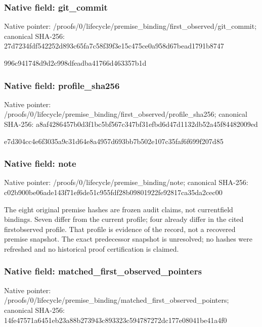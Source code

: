 \documentclass[10pt,a4paper]{article}
\begin{document}
\subsubsection{Native field: git\_commit}


Native pointer: /proofs/0/lifecycle/prem\allowbreak{}ise\_binding/first\_observ\allowbreak{}ed/git\_commit; canonical SHA-256: 27d7234fdf542252d893c65f\allowbreak{}a7c58f39f3e15c475ce0a958\allowbreak{}d67bead1791b8747


996c941748d9d2c998dfeadb\allowbreak{}a41766d463357b1d


\subsubsection{Native field: profile\_sha256}


Native pointer: /proofs/0/lifecycle/prem\allowbreak{}ise\_binding/first\_observ\allowbreak{}ed/profile\_sha256; canonical SHA-256: a8af4286457b0d3f1bc5bf56\allowbreak{}7c347bf31efbd6d47d1132db\allowbreak{}52a45f84482009ed


e7d304cc4e6f3035a9c31d64\allowbreak{}e8a4957d693bb7b502e107c3\allowbreak{}5faf6f699f207d85


\subsubsection{Native field: note}


Native pointer: /proofs/0/lifecycle/prem\allowbreak{}ise\_binding/note; canonical SHA-256: c02b900be06ade143f71ef6d\allowbreak{}e51c955fdf28b09801922fe9\allowbreak{}2817ca35da2cec00


The eight original premise hashes are frozen audit claims, not currentfield bindings. Seven differ from the current profile; four already differ in the cited firstobserved profile. That profile is evidence of the record, not a recovered premise snapshot. The exact predecessor snapshot is unresolved; no hashes were refreshed and no historical proof certification is claimed.


\subsubsection{Native field: matched\_first\_observed\_pointers}


Native pointer: /proofs/0/lifecycle/prem\allowbreak{}ise\_binding/matched\_firs\allowbreak{}t\_observed\_pointers; canonical SHA-256: 14fe47571a6451eb23a88b27\allowbreak{}3943c893323c594787272dc1\allowbreak{}77e08041be41a4f0
\end{document}
